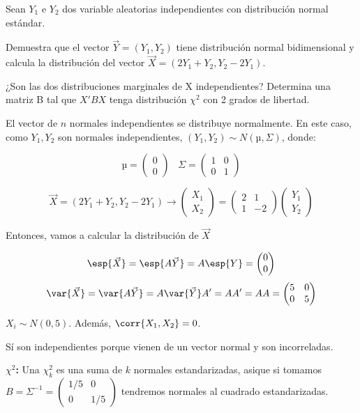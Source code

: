 \begin{problem}[4]
Sean $Y_1$ e $Y_2$ dos variable aleatorias independientes con distribución normal estándar.

\ppart  Demuestra que el vector $\vec{Y} = (Y_1 , Y_2 )$ tiene distribución normal bidimensional y calcula la distribución del vector $\vec{X} = (2Y_1 + Y_2 , Y_2 − 2Y_1 )$.

\ppart  ¿Son las dos distribuciones marginales de X independientes? Determina una matriz B tal que $X'BX$ tenga distribución $χ^2$ con 2 grados de libertad.
\solution


\spart El vector de $n$ normales independientes se distribuye normalmente. En este caso, como $Y_1,Y_2$ son normales independientes, $(Y_1,Y_2) \sim N(µ,Σ)$, donde:

\[µ = \begin{pmatrix}0\\0\end{pmatrix}\;\;\; Σ = \begin{pmatrix}1&0\\0&1\end{pmatrix}\]

\[\vec{X} = (2Y_1 + Y_2 , Y_2 − 2Y_1 ) \to \begin{pmatrix}X_1\\X_2\end{pmatrix} = \begin{pmatrix}2&1\\1&-2\end{pmatrix}\begin{pmatrix}Y_1\\Y_2\end{pmatrix}\]

Entonces, vamos a calcular la distribución de $\vec{X}$

\[
\esp{\vec{X}} = \esp{A\vec{Y}} = A\esp{Y} = \begin{pmatrix}0\\0\end{pmatrix}
\]
\[
\var{\vec{X}} = \var{A\vec{Y}} = A\var{\vec{Y}}A' = AA' = AA = \begin{pmatrix} 5&0\\0&5\end{pmatrix}
\]

\spart $X_i \sim N(0,5)$. Además, $\corr{X_1,X_2} = 0$.

Sí son independientes porque vienen de un vector normal y son incorreladas.


\textbf{$\chi^2$:} Una $\chi^2_k$ es una suma de $k$ normales estandarizadas, asique si tomamos $B = Σ^{-1} = \begin{pmatrix}1/5&0\\0&1/5\end{pmatrix}$ tendremos normales al cuadrado estandarizadas.


\end{problem}

